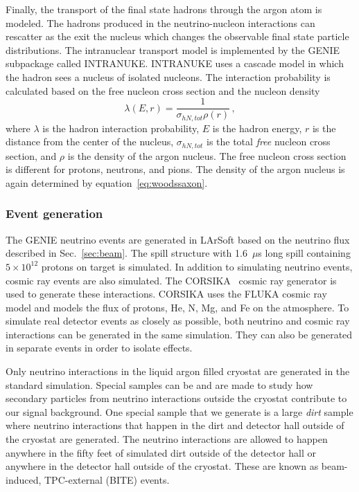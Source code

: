     Finally, the transport of the final state hadrons through the argon atom is
    modeled. The hadrons produced in the neutrino-nucleon interactions can
    rescatter as the exit the nucleus which changes the observable final state
    particle distributions. The intranuclear transport model is implemented by
    the GENIE subpackage called INTRANUKE. INTRANUKE uses a cascade model in
    which the hadron sees a nucleus of isolated nucleons. The interaction
    probability is calculated based on the free nucleon cross section and the
    nucleon density~\cite{Andreopoulos:2015wxa}
    \begin{equation}
      \lambda(E,r) = \frac{1}{\sigma_{hN,tot} \rho(r)} \,,
    \end{equation}
    where $\lambda$ is the hadron interaction probability, $E$ is the hadron
    energy, $r$ is the distance from the center of the nucleus,
    $\sigma_{hN,tot}$ is the total \textit{free} nucleon cross section, and
    $\rho$ is the density of the argon nucleus. The free nucleon cross section
    is different for protons, neutrons, and pions. The density of the argon
    nucleus is again determined by equation~\ref{eq:woodssaxon}.

  \subsubsection{Event generation}
    The GENIE neutrino events are generated in LArSoft based on the neutrino
    flux described in Sec.~\ref{sec:beam}. The spill structure with 1.6~$\mu$s
    long spill containing $5\times 10^{12}$ protons on target is simulated.  In
    addition to simulating neutrino events, cosmic ray events are also
    simulated. The CORSIKA~\cite{corsika} cosmic ray generator is used to
    generate these interactions. CORSIKA uses the FLUKA cosmic ray model and
    models the flux of protons, He, N, Mg, and Fe on the atmosphere.  To
    simulate real detector events as closely as possible, both neutrino and
    cosmic ray interactions can be generated in the same simulation. They can
    also be generated in separate events in order to isolate effects.

    Only neutrino interactions in the liquid argon filled cryostat are
    generated in the standard simulation. Special samples can be and are made
    to study how secondary particles from neutrino interactions outside the
    cryostat contribute to our signal background. One special sample that we
    generate is a large \textit{dirt} sample where neutrino interactions that
    happen in the dirt and detector hall outside of the cryostat are generated.
    The neutrino interactions are allowed to happen anywhere in the fifty feet
    of simulated dirt outside of the detector hall or anywhere in the detector
    hall outside of the cryostat. These are known as beam-induced, TPC-external
    (BITE) events.

